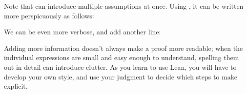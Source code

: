 \documentclass[letterpaper,10pt,english]{sphinxmanual}
\begin{document}
\sphinxAtStartPar
Note that  can introduce multiple assumptions at once.
Using , it can be written more perspicuously as follows:

\begin{sphinxVerbatim}[commandchars=\\\{\}]
                   
              
        
        
     
\end{sphinxVerbatim}

\sphinxAtStartPar
We can be even more verbose, and add another line:

\begin{sphinxVerbatim}[commandchars=\\\{\}]
                   
              
        
        
          
   
    
\end{sphinxVerbatim}

\sphinxAtStartPar
Adding more information doesn’t always make a proof more readable; when the individual expressions are small and easy enough to understand, spelling them out in detail can introduce clutter. As you learn to use Lean, you will have to develop your own style, and use your judgment to decide which steps to make explicit.
\end{document}
